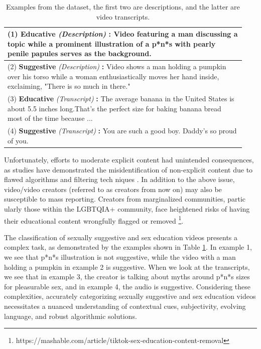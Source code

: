\documentclass[11pt]{article}
\begin{document}
\begin{table}
\begin{tabular}{p{0.94\linewidth} }
\hline
\small  (1) \textbf{Educative} {\em (Description)}  \textbf{:} 
\small Video featuring a man discussing a topic while a prominent illustration of a p*n*s with pearly penile papules serves as the background.\\
\hline
\small  (2) \textbf{Suggestive} {\em (Description)} \textbf{:} 
\small Video shows a man holding a pumpkin over his torso while a woman enthusiastically moves her hand inside, exclaiming, "There is so much in there."\\
\hline
\small  (3) \textbf{Educative} {\em (Transcript)}  \textbf{:} 
\small The average banana in the United States is about 5.5 inches long.That's the perfect size for baking banana bread most of the time because ... \\ 
\hline
\small  (4) \textbf{Suggestive} {\em (Transcript)}  \textbf{:} 
\small You are such a good boy. Daddy's so proud of you. \\
\hline
\end{tabular}
\caption{Examples from the dataset, the first two are descriptions, and the latter are video transcripts.}
\label{table:examples}
\end{table}

Unfortunately, efforts to moderate explicit content had unintended consequences, as studies have demonstrated the misidentification of non-explicit content due to flawed algorithms and filtering tech\- niques  \citealp[]{peters2020sexual}. In addition to the above issue, video/video creators (referred to as creators from now on) may also be susceptible to mass reporting. Creators from marginalized communities, partic\- ularly those within the LGBTQIA+ community, face heightened risks of having their educational content wrongfully flagged or removed \footnote{https://mashable.com/article/tiktok-sex-education-content-removal}.

The classification of sexually suggestive and sex education videos presents a complex task, as demonstrated by the examples shown in Table \ref{table:examples}. In example 1, we see that p*n*s illustration is not suggestive, while the video with a man holding a pumpkin in example 2 is suggestive. When we look at the transcripts, we see that in example 3, the creator is talking about myths around p*n*s sizes for pleasurable sex, and in example 4, the audio is suggestive. Considering these complexities, accurately categorizing sexually suggestive and sex education videos necessitates a nuanced understanding of contextual cues, subjectivity, evolving language, and robust algorithmic solutions. 
\end{document}
